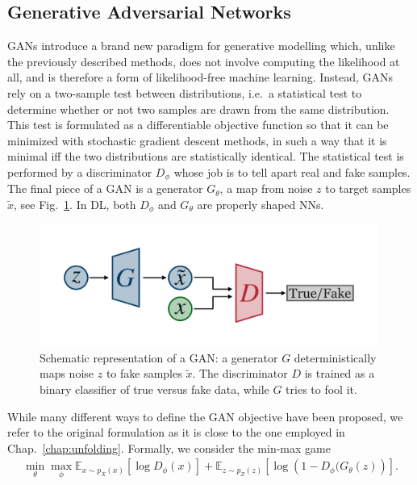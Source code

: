 \subsection{Generative Adversarial Networks}\label{intro:gan}
GANs introduce a brand new paradigm for generative modelling which, unlike the previously described methods, does not involve computing the likelihood at all, and is therefore a form of likelihood-free machine learning. Instead, GANs rely on a two-sample test between distributions, i.e.\   a statistical test to determine whether or not two samples are drawn from the same distribution. This test is formulated as a differentiable objective function so that it can be minimized with stochastic gradient descent methods, in such a way that it is minimal iff the two distributions are statistically identical.
The statistical test is performed by a discriminator $D_{\phi}$ whose job is to tell apart real and fake samples. The final piece of a GAN is a generator $G_{\theta}$, a map from noise $z$ to target samples $\tilde{x}$, see Fig.~\ref{fig:gan}. In DL, both $D_{\phi}$ and $G_{\theta}$ are properly shaped NNs.
%
\begin{figure}[t]
\centering
\includegraphics[page = 1, width=0.99\textwidth]{./figures/gan}
\caption{Schematic representation of a GAN: a generator $G$ deterministically maps noise $z$ to fake samples $\tilde{x}$. The discriminator $D$ is trained as a binary classifier of true versus fake data, while $G$ tries to fool it.}
\label{fig:gan}
\end{figure}
%
While many different ways to define the GAN objective have been proposed, we refer to the original formulation\cite{goodfellow} as it is close to the one employed in Chap.~\ref{chap:unfolding}. Formally, we consider the min-max game 
%
\begin{align}
\min_{\theta} \max_{\phi}\mathbb{E}_{x \sim p_{X}(x)} \left[ \log D_{\phi} (x) \right] + \mathbb{E}_{z\sim p_{Z}(z)} \left[ \log \left( 1 - D_{\phi} (G_{\theta}(z) \right) \right].
\end{align}
